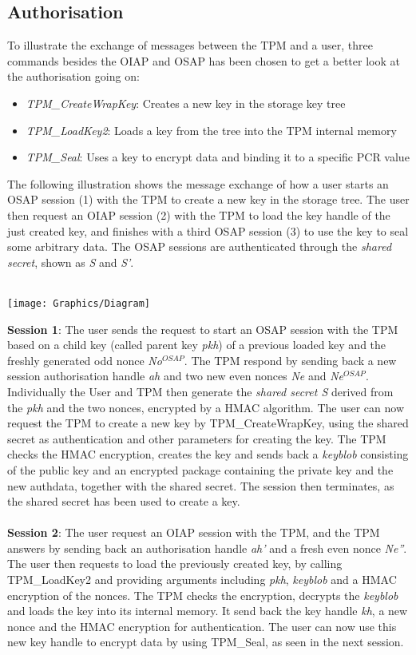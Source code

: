 \subsection{Authorisation}
To illustrate the exchange of messages between the TPM and a user, three commands besides the OIAP and OSAP has been chosen to get a better look at the authorisation going on:
\begin{itemize}
	\item \textit{TPM\_CreateWrapKey}: Creates a new key in the storage key tree
	\item \textit{TPM\_LoadKey2}: Loads a key from the tree into the TPM internal memory
	\item \textit{TPM\_Seal}: Uses a key to encrypt data and binding it to a specific PCR value
\end{itemize}
The following illustration shows the message exchange of how a user starts an OSAP session (1) with the TPM to create a new key in the storage tree. The user then request an OIAP session (2) with the TPM to load the key handle of the just created key, and finishes with a third OSAP session (3) to use the key to seal some arbitrary data. The OSAP sessions are authenticated through the \textit{shared secret}, shown as \textit{S} and \textit{S'}. \\ \\
\begin{center}
\texttt{[image: Graphics/Diagram]}
\end{center}
\textbf{Session 1}: The user sends the request to start an OSAP session with the TPM based on a child key (called parent key \textit{pkh}) of a previous loaded key and the freshly generated odd nonce \textit{No$^{OSAP}$}. The TPM respond by sending back a new session authorisation handle \textit{ah} and two new even nonces \textit{Ne} and \textit{Ne$^{OSAP}$}. Individually the User and TPM then generate the \textit{shared secret S} derived from the \textit{pkh} and the two nonces, encrypted by a HMAC algorithm. The user can now request the TPM to create a new key by TPM\_CreateWrapKey, using the shared secret as authentication and other parameters for creating the key. The TPM checks the HMAC encryption, creates the key and sends back a \textit{keyblob} consisting of the public key and an encrypted package containing the private key and the new authdata, together with the shared secret. The session then terminates, as the shared secret has been used to create a key. \\ \\
\textbf{Session 2}: The user request an OIAP session with the TPM, and the TPM answers by sending back an authorisation handle \textit{ah'} and a fresh even nonce \textit{Ne''}. The user then requests to load the previously created key, by calling TPM\_LoadKey2 and providing arguments including \textit{pkh}, \textit{keyblob} and a HMAC encryption of the nonces. The TPM checks the encryption, decrypts the \textit{keyblob} and loads the key into its internal memory. It send back the key handle \textit{kh}, a new nonce and the HMAC encryption for authentication. The user can now use this new key handle to encrypt data by using TPM\_Seal, as seen in the next session. \\ \\
